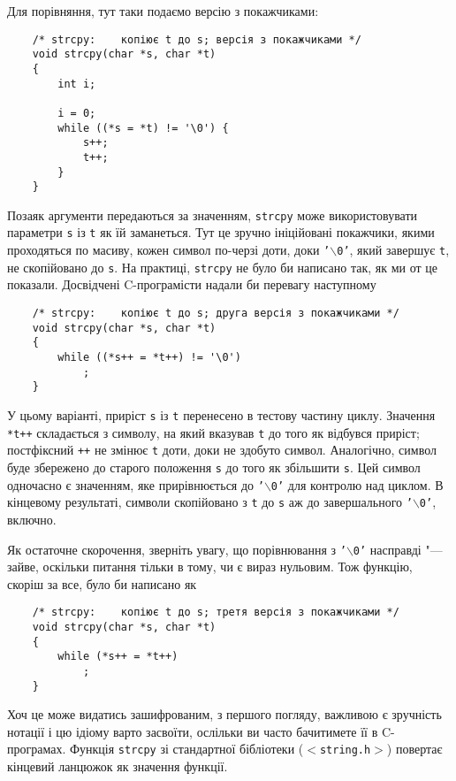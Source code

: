 \documentclass[a4paper,12pt]{book}
\begin{document}
  Для порівняння, тут таки подаємо версію з покажчиками:
  \begin{verbatim}
    /* strcpy:    копіює t до s; версія з покажчиками */
    void strcpy(char *s, char *t)
    {
        int i;

        i = 0;
        while ((*s = *t) != '\0') {
            s++;
            t++;
        }
    }
  \end{verbatim}

  Позаяк аргументи передаються за значенням, \texttt{strcpy} може використовувати
  параметри \texttt{s} із \texttt{t} як їй заманеться. Тут це зручно ініційовані
  покажчики, якими проходяться по масиву, кожен символ по-черзі доти, доки
  \texttt{'\mbox{$\backslash$}0'}, який завершує \texttt{t}, не скопійовано до \texttt{s}.
  На практиці, \texttt{strcpy} не було би написано так, як ми от це показали. Досвідчені
  C-програмісти надали би перевагу наступному
  \begin{verbatim}
    /* strcpy:    копіює t до s; друга версія з покажчиками */
    void strcpy(char *s, char *t)
    {
        while ((*s++ = *t++) != '\0')
            ;
    }
  \end{verbatim}

  У цьому варіанті, приріст \texttt{s} із \texttt{t} перенесено в тестову частину циклу.
  Значення \texttt{*t++} складається з символу, на який вказував \texttt{t} до того як
  відбувся приріст; постфіксний \texttt{++} не змінює \texttt{t} доти, доки не здобуто
  символ. Аналогічно, символ буде збережено до старого положення \texttt{s} до того як
  збільшити \texttt{s}. Цей символ одночасно є значенням, яке прирівнюється до
  \texttt{'\mbox{$\backslash$}0'} для контролю над циклом. В кінцевому результаті, символи
  скопійовано з \texttt{t} до \texttt{s} аж до завершального
  \texttt{'\mbox{$\backslash$}0'}, включно.
  
  Як остаточне скорочення, зверніть увагу, що порівнювання з
  \texttt{'\mbox{$\backslash$}0'} насправді "--- зайве, оскільки питання тільки в тому, чи
  є вираз нульовим. Тож функцію, скоріш за все, було би написано як
  \begin{verbatim}
    /* strcpy:    копіює t до s; третя версія з покажчиками */
    void strcpy(char *s, char *t)
    {
        while (*s++ = *t++)
            ;
    }
  \end{verbatim}

  Хоч це може видатись зашифрованим, з першого погляду, важливою є зручність нотації і цю
  ідіому варто засвоїти, ослільки ви часто бачитимете її в C-програмах. Функція
  \texttt{strcpy} зі стандартної бібліотеки (\texttt{\mbox{$<$}string.h\mbox{$>$}})
  повертає кінцевий ланцюжок як значення функції.
  
\end{document}
